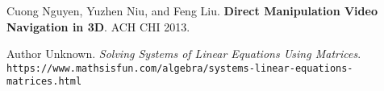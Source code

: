 \begin{thebibliography}{9}

Cuong Nguyen, Yuzhen Niu, and Feng Liu. \textbf{Direct Manipulation Video Navigation in 3D}. ACH CHI 2013.

Author Unknown. \textit{Solving Systems of Linear Equations Using Matrices}. \texttt{https://www.mathsisfun.com/algebra/systems-linear-equations-matrices.html}

\end{thebibliography}
